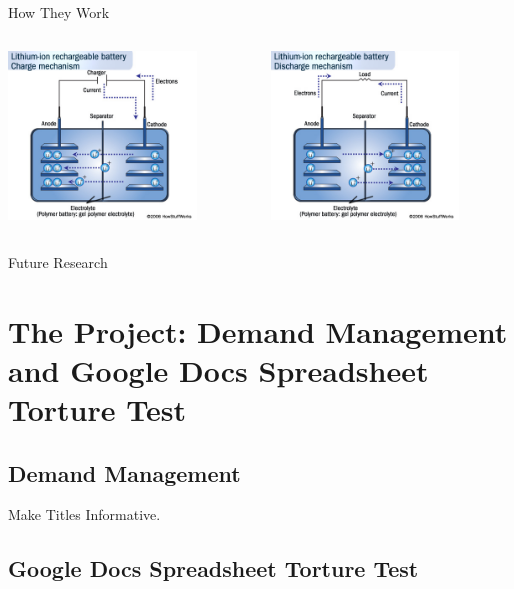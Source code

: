 \documentclass{beamer}
\begin{document}
\begin{frame}{How They Work}
  \begin{columns}
    \begin{column}{5cm}
      \includegraphics[width=5cm]{lionCharge.jpg}
    \end{column}
    \begin{column}{5cm}
      \includegraphics[width=5cm]{lionDischarge.jpg}
    \end{column}
  \end{columns}
\end{frame}

\begin{frame}{Future Research}
  
\end{frame}

\section[Research Project]{The Project: Demand Management and Google Docs Spreadsheet Torture Test}

\subsection{Demand Management}

\begin{frame}{Make Titles Informative.}
\end{frame}

\subsection[GDocs Spreadsheet Testing]{Google Docs Spreadsheet Torture Test}
\end{document}
